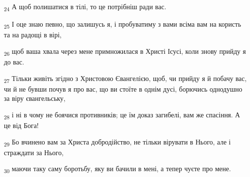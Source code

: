 \begin{tcolorbox}
\textsubscript{24} А щоб полишатися в тілі, то це потрібніш ради вас.
\end{tcolorbox}
\begin{tcolorbox}
\textsubscript{25} І оце знаю певно, що залишусь я, і пробуватиму з вами всіма вам на користь та на радощі в вірі,
\end{tcolorbox}
\begin{tcolorbox}
\textsubscript{26} щоб ваша хвала через мене примножилася в Христі Ісусі, коли знову прийду я до вас.
\end{tcolorbox}
\begin{tcolorbox}
\textsubscript{27} Тільки живіть згідно з Христовою Євангелією, щоб, чи прийду я й побачу вас, чи й не бувши почув я про вас, що ви стоїте в однім дусі, борючись однодушно за віру євангельську,
\end{tcolorbox}
\begin{tcolorbox}
\textsubscript{28} і ні в чому не боячися противників; це їм доказ загибелі, вам же спасіння. А це від Бога!
\end{tcolorbox}
\begin{tcolorbox}
\textsubscript{29} Бо вчинено вам за Христа добродійство, не тільки вірувати в Нього, але і страждати за Нього,
\end{tcolorbox}
\begin{tcolorbox}
\textsubscript{30} маючи таку саму боротьбу, яку ви бачили в мені, а тепер чуєте про мене.
\end{tcolorbox}
